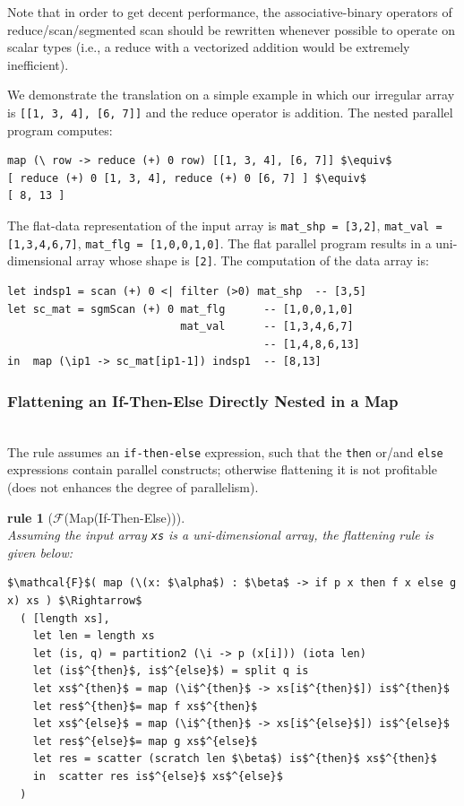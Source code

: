 \documentclass[acmsmall,review]{acmart}\settopmatter{printfolios=true,printccs=false,printacmref=false}
\newtheorem{rewrite}{rule}
\begin{document}
Note that in order to get decent performance, the associative-binary 
operators of reduce/scan/segmented scan should be rewritten whenever 
possible to operate on scalar types (i.e., a reduce with a vectorized 
addition would be extremely inefficient).

We demonstrate the translation on a simple example in which our
irregular array is  {\tt[[1, 3, 4], [6, 7]]} and the reduce operator
is addition. The nested parallel program computes:
\begin{lstlisting}[mathescape=true]
map (\ row -> reduce (+) 0 row) [[1, 3, 4], [6, 7]] $\equiv$
[ reduce (+) 0 [1, 3, 4], reduce (+) 0 [6, 7] ] $\equiv$
[ 8, 13 ]
\end{lstlisting}\vspace{-2ex}

The flat-data representation of the input array is {\tt mat\_shp = [3,2]},
{\tt mat\_val = [1,3,4,6,7]}, {\tt mat\_flg = [1,0,0,1,0]}.
The flat parallel program results in a uni-dimensional array whose shape 
is {\tt[2]}.
The computation of the data array is:
\begin{lstlisting}[mathescape=true]
let indsp1 = scan (+) 0 <| filter (>0) mat_shp  -- [3,5]
let sc_mat = sgmScan (+) 0 mat_flg      -- [1,0,0,1,0] 
                           mat_val      -- [1,3,4,6,7]
                                        -- [1,4,8,6,13]
in  map (\ip1 -> sc_mat[ip1-1]) indsp1  -- [8,13]
\end{lstlisting}\vspace{-2ex}


\newpage
\subsubsection{Flattening an If-Then-Else Directly Nested in a Map}
\label{subsubsec:if-in-map}
$\mbox{ }$\\

The rule assumes an \lstinline{if-then-else} expression, such that the 
\lstinline{then} or/and \lstinline{else} expressions contain parallel 
constructs; otherwise flattening it is not profitable (does not
enhances the degree of parallelism).

\begin{rewrite}[$\mathcal{F}$(Map(If-Then-Else))]\label{Flat-If-In-Map}
$\mbox{ }$\\
Assuming the input array {\tt xs} is a uni-dimensional array, the 
flattening rule is given below:
\begin{lstlisting}[mathescape=true]
$\mathcal{F}$( map (\(x: $\alpha$) : $\beta$ -> if p x then f x else g x) xs ) $\Rightarrow$
  ( [length xs],
    let len = length xs
    let (is, q) = partition2 (\i -> p (x[i])) (iota len)
    let (is$^{then}$, is$^{else}$) = split q is
    let xs$^{then}$ = map (\i$^{then}$ -> xs[i$^{then}$]) is$^{then}$
    let res$^{then}$= map f xs$^{then}$
    let xs$^{else}$ = map (\i$^{then}$ -> xs[i$^{else}$]) is$^{else}$    
    let res$^{else}$= map g xs$^{else}$
    let res = scatter (scratch len $\beta$) is$^{then}$ xs$^{then}$
    in  scatter res is$^{else}$ xs$^{else}$
  )
\end{lstlisting}\vspace{-2ex}
\end{rewrite}
\end{document}
